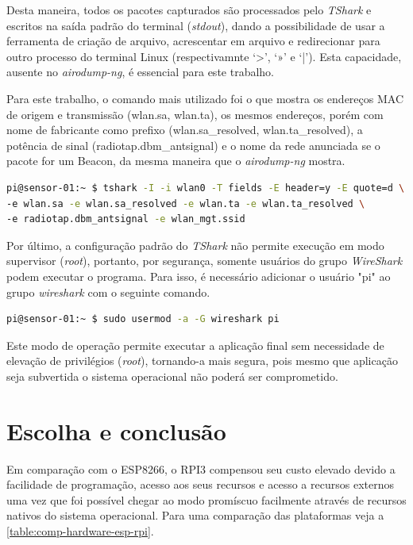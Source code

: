 Desta maneira, todos os pacotes capturados são processados pelo \emph{TShark} e
escritos na saída padrão do terminal (\emph{stdout}), dando a possibilidade de
usar a ferramenta de criação de arquivo, acrescentar em arquivo e redirecionar
para outro processo do terminal Linux (respectivamnte ‘>’, ‘»’ e ‘|’). Esta
capacidade, ausente no \emph{airodump-ng}, é essencial para este trabalho.

Para este trabalho, o comando mais utilizado foi o que mostra os endereços MAC
de origem e transmissão (wlan.sa, wlan.ta), os mesmos endereços, porém com nome
de fabricante como prefixo (wlan.sa\_resolved, wlan.ta\_resolved), a potência de
sinal (radiotap.dbm\_antsignal) e o nome da rede anunciada se o pacote for um
Beacon, da mesma maneira que o \emph{airodump-ng} mostra.

\begin{lstlisting}[language=bash,caption={TShark e opções},label=code-tshark]
pi@sensor-01:~ $ tshark -I -i wlan0 -T fields -E header=y -E quote=d \
-e wlan.sa -e wlan.sa_resolved -e wlan.ta -e wlan.ta_resolved \
-e radiotap.dbm_antsignal -e wlan_mgt.ssid
\end{lstlisting}

Por último, a configuração padrão do \emph{TShark} não permite execução em modo
supervisor (\emph{root}), portanto, por segurança, somente usuários do grupo
\emph{WireShark} podem executar o programa. Para isso, é necessário adicionar o
usuário "pi"  ao grupo \emph{wireshark} com o seguinte comando.

\begin{lstlisting}[language=bash,caption={Adição do usuário pi ao grupo \emph{wireshark}},label=code-usermod]
pi@sensor-01:~ $ sudo usermod -a -G wireshark pi
\end{lstlisting}

Este modo de operação permite executar a aplicação final sem necessidade de
elevação de privilégios (\emph{root}), tornando-a mais segura, pois mesmo que
aplicação seja subvertida o sistema operacional não poderá ser comprometido.

\clearpage
\section{Escolha e conclusão}
\label{sec:escolha-plataforma}

Em comparação com o ESP8266, o RPI3 compensou seu custo elevado devido a
facilidade de programação, acesso aos seus recursos e acesso a recursos externos uma
vez que foi possível chegar ao modo promíscuo facilmente através de recursos nativos do
sistema operacional. Para uma comparação das plataformas veja a \autoref{table:comp-hardware-esp-rpi}.

